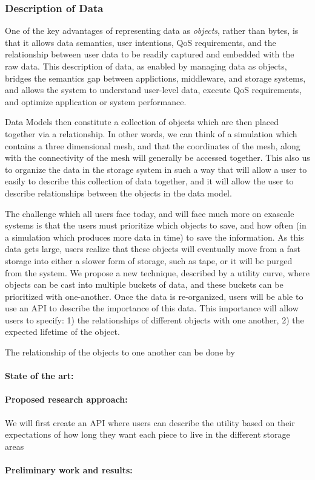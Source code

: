 \subsubsection{Description of Data}

One of the key advantages of representing data as \textit{objects}, rather than 
bytes, is that it allows data semantics, user intentions, QoS requirements, and
the relationship between user data to be readily captured and embedded with the 
raw data. This description of data, as enabled by managing data as objects, bridges 
the semantics gap between applictions, middleware, and storage systems,
and allows the system to understand user-level data, execute QoS requirements, and
optimize application or system performance.

Data Models then constitute a collection
of objects which are then placed together via a relationship. In other words, we can think of a
simulation which contains a three dimensional mesh, and that the coordinates of the mesh, along
with the connectivity of the mesh will generally be accessed together. This also us to organize
the data in the storage system in such a way that will allow a user to easily to describe this 
collection of data together, and it will allow the user to describe relationships between the objects
in the data model. 

The challenge which all users face today, and will face much more on exascale systems is that 
the users must prioritize which objects to save, and how often (in a simulation which produces more
data in time)  to save the information. As this data gets large,  users realize that these objects will
eventually move from a fast storage into either a slower form of storage, such as tape, or it will be
purged from the system.  We propose a new technique, described by a utility curve, where objects
can be cast into multiple buckets of data, and these buckets can be prioritized with one-another.
Once the data is re-organized, users will be able to use an API to describe the importance of this data.
This importance will allow users to specify: 1) the relationships of different objects with one another,
2) the expected lifetime of the object.

The relationship of the objects to one another can be done by

\paragraph{State of the art:} 
\paragraph{Proposed research approach:} 
We will first create an API where users can describe the utility based on their expectations of how
long they want each piece to live in the different storage areas
\paragraph{Preliminary work and results:}

